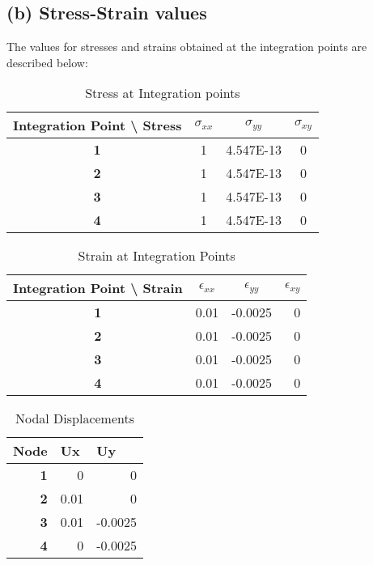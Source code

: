 \documentclass[11pt]{article}
\begin{document}
\subsection*{(b) Stress-Strain values}
The values for stresses and strains obtained at the integration points are described below:
\begin{table}[!htbp]
  \centering
  \caption{Stress at Integration points}
    \begin{tabular}{cccc}
    \toprule
    \textbf{Integration Point \textbackslash{}  Stress} & \bf{ $\sigma_{xx}$} & \bf{$\sigma_{yy}$} & \bf{$\sigma_{xy}$} \\
    \midrule
    \textbf{1} & 1 & 4.547E-13 & 0 \\
    \textbf{2} & 1 & 4.547E-13 & 0 \\
    \textbf{3} & 1 & 4.547E-13 & 0 \\
    \textbf{4} & 1 & 4.547E-13 & 0 \\
    \bottomrule
    \end{tabular}%
  \label{tab:addlabel}%
\end{table}%
\begin{table}[!htbp]
  \centering
  \caption{Strain at Integration Points}
    \begin{tabular}{crrr}
    \toprule
    \textbf{Integration Point \textbackslash{}  Strain} & \multicolumn{1}{c}{\bf{$\epsilon_{xx}$}} & \multicolumn{1}{c}{\bf{$\epsilon_{yy}$}} & \multicolumn{1}{c}{\bf{$\epsilon_{xy}$}} \\
    \midrule
    \textbf{1} & 0.01  & -0.0025 & 0 \\
    \textbf{2} & 0.01  & -0.0025 & 0 \\
    \textbf{3} & 0.01  & -0.0025 & 0 \\
    \textbf{4} & 0.01  & -0.0025 & 0 \\
    \bottomrule
    \end{tabular}%
  \label{tab:addlabel}%
\end{table}%
\begin{table}[!htbp]
  \centering
  \caption{Nodal Displacements}
    \begin{tabular}{rrr}
    \toprule
    \multicolumn{1}{l}{\textbf{Node}} & \multicolumn{1}{l}{\textbf{Ux}} & \multicolumn{1}{l}{\textbf{Uy}} \\
    \midrule
    \textbf{1} & 0     & 0 \\
    \textbf{2} & 0.01  & 0 \\
    \textbf{3} & 0.01  & -0.0025 \\
    \textbf{4} & 0     & -0.0025 \\
    \bottomrule
    \end{tabular}%
  \label{tab:addlabel}%
\end{table}%
\end{document}

